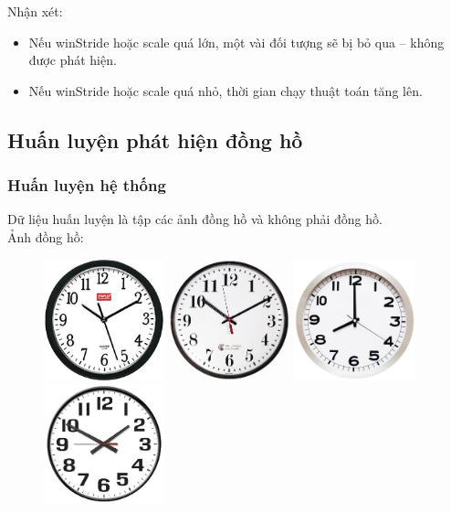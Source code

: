 \documentclass[../report.tex]{subfiles}
\begin{document}
\noindent Nhận xét:
\begin{itemize}
    \item Nếu winStride hoặc scale quá lớn, 
        một vài đối tượng sẽ bị bỏ qua – không được phát hiện.
    \item Nếu winStride hoặc scale quá nhỏ, 
        thời gian chạy thuật toán tăng lên.
\end{itemize}

\subsection{Huấn luyện phát hiện đồng hồ}
\subsubsection{Huấn luyện hệ thống}
Dữ liệu huấn luyện là tập các ảnh 
đồng hồ và không phải đồng hồ. \\[3mm]
Ảnh đồng hồ:
\begin{figure}[H]
\centering
\includegraphics[width=3.5cm]{figures/clock-1.png}
\includegraphics[width=3.5cm]{figures/clock-2.png}
\includegraphics[width=3.5cm]{figures/clock-3.png}
\includegraphics[width=3.5cm]{figures/clock-4.png}
\end{figure}
\end{document}
